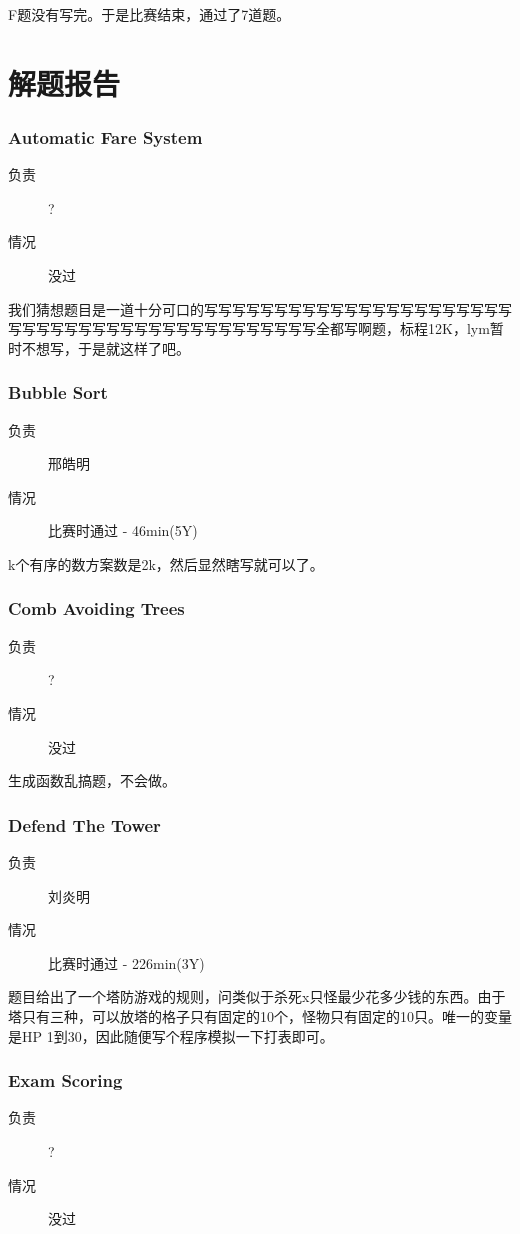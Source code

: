 \documentclass[a4paper, 11pt, nofonts, nocap, fancyhdr]{ctexart}
\newcommand{\problem}[1]{\subsubsection{#1}}
\begin{document}
F题没有写完。于是比赛结束，通过了7道题。


\section{解题报告}

\problem{Automatic Fare System}

\begin{description}
\item[负责] ?
\item[情况] 没过
\end{description}

我们猜想题目是一道十分可口的写写写写写写写写写写写写写写写写写写写写写写写写写写写写写写写写写写写写写写写写写写写写全都写啊题，标程12K，lym暂时不想写，于是就这样了吧。

\problem{Bubble Sort}

\begin{description}
\item[负责] 邢皓明
\item[情况] 比赛时通过 - 46min(5Y)
\end{description}

k个有序的数方案数是2k，然后显然瞎写就可以了。

\problem{Comb Avoiding Trees}

\begin{description}
\item[负责] ?
\item[情况] 没过
\end{description}

生成函数乱搞题，不会做。

\problem{Defend The Tower}

\begin{description}
\item[负责] 刘炎明
\item[情况] 比赛时通过 - 226min(3Y)
\end{description}

题目给出了一个塔防游戏的规则，问类似于杀死x只怪最少花多少钱的东西。由于塔只有三种，可以放塔的格子只有固定的10个，怪物只有固定的10只。唯一的变量是HP 1到30，因此随便写个程序模拟一下打表即可。

\problem{Exam Scoring}

\begin{description}
\item[负责] ?
\item[情况] 没过
\end{description}
\end{document}
